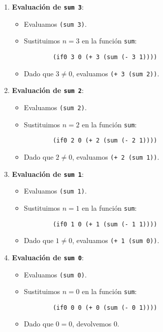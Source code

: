 \documentclass{article}
\begin{document}
\begin{enumerate}
    \item \textbf{Evaluación de \texttt{sum 3}}:
    \begin{itemize}
        \item Evaluamos \texttt{(sum 3)}.
        \item Sustituimos \(n = 3\) en la función \texttt{sum}:
        \begin{lstlisting}
        (if0 3 0 (+ 3 (sum (- 3 1))))
        \end{lstlisting}
        \item Dado que \(3 \neq 0\), evaluamos \texttt{(+ 3 (sum 2))}.
    \end{itemize}
    
    \item \textbf{Evaluación de \texttt{sum 2}}:
    \begin{itemize}
        \item Evaluamos \texttt{(sum 2)}.
        \item Sustituimos \(n = 2\) en la función \texttt{sum}:
        \begin{lstlisting}
        (if0 2 0 (+ 2 (sum (- 2 1))))
        \end{lstlisting}
        \item Dado que \(2 \neq 0\), evaluamos \texttt{(+ 2 (sum 1))}.
    \end{itemize}
    
    \item \textbf{Evaluación de \texttt{sum 1}}:
    \begin{itemize}
        \item Evaluamos \texttt{(sum 1)}.
        \item Sustituimos \(n = 1\) en la función \texttt{sum}:
        \begin{lstlisting}
        (if0 1 0 (+ 1 (sum (- 1 1))))
        \end{lstlisting}
        \item Dado que \(1 \neq 0\), evaluamos \texttt{(+ 1 (sum 0))}.
    \end{itemize}
    
    \item \textbf{Evaluación de \texttt{sum 0}}:
    \begin{itemize}
        \item Evaluamos \texttt{(sum 0)}.
        \item Sustituimos \(n = 0\) en la función \texttt{sum}:
        \begin{lstlisting}
        (if0 0 0 (+ 0 (sum (- 0 1))))
        \end{lstlisting}
        \item Dado que \(0 = 0\), devolvemos 0.
    \end{itemize}


\end{enumerate}
\end{document}
